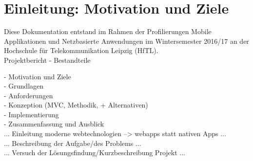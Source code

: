 \section{Einleitung: Motivation und Ziele}

Diese Dokumentation entstand im Rahmen der Profilierungen  \glqq{}Mobile Applikationen\grqq{} und \glqq{}Netzbasierte Anwendungen\grqq{} im Wintersemester 2016/17 an der Hochschule für Telekommunikation Leipzig (HfTL). \\


Projektbericht - Bestandteile

- Motivation und Ziele\\
- Grundlagen \\
- Anforderungen \\  
- Konzeption (MVC, Methodik, + Alternativen) \\
- Implementierung \\
- Zusammenfassung und Ausblick \\


... Einleitung moderne webtechnologien --> webapps statt nativen Apps ... \\
... Beschreibung der Aufgabe/des Problems ...\\

... Versuch der Lösungsfindung/Kurzbeschreibung Projekt ... \\

